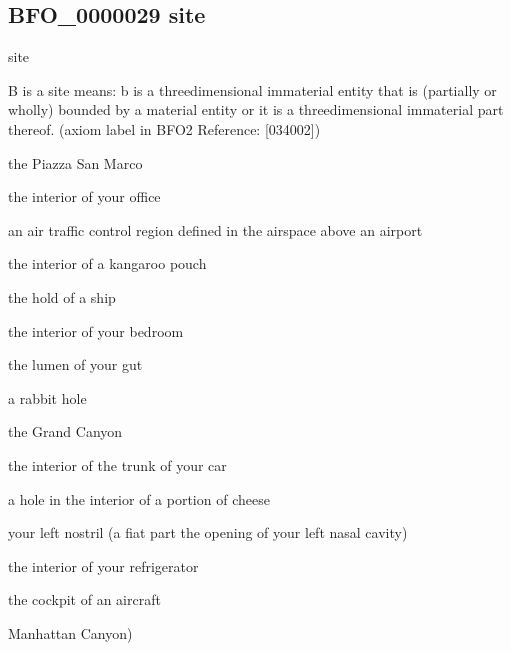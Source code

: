 \documentclass[letterpaper,10pt,english]{sphinxmanual}
\begin{document}
\begin{sphinxShadowBox}

\sphinxAtStartPar
{}
\end{sphinxShadowBox}
\begin{quote}

\ignorespaces \end{quote}


\subsection{BFO\_0000029 \sphinxhyphen{} site}
\label{\detokenize{doc-BFO_0000029:bfo-0000029-site}}\label{\detokenize{doc-BFO_0000029:index-0}}\label{\detokenize{doc-BFO_0000029::doc}}
\begin{sphinxShadowBox}

\sphinxAtStartPar
site
\end{sphinxShadowBox}

\begin{sphinxShadowBox}

\sphinxAtStartPar
B is a site means: b is a three\sphinxhyphen{}dimensional immaterial entity that is (partially or wholly) bounded by a material entity or it is a three\sphinxhyphen{}dimensional immaterial part thereof. (axiom label in BFO2 Reference: {[}034\sphinxhyphen{}002{]})
\end{sphinxShadowBox}

\begin{sphinxShadowBox}

\sphinxAtStartPar
the Piazza San Marco

\sphinxAtStartPar
the interior of your office

\sphinxAtStartPar
an air traffic control region defined in the airspace above an airport

\sphinxAtStartPar
the interior of a kangaroo pouch

\sphinxAtStartPar
the hold of a ship

\sphinxAtStartPar
the interior of your bedroom

\sphinxAtStartPar
the lumen of your gut

\sphinxAtStartPar
a rabbit hole

\sphinxAtStartPar
the Grand Canyon

\sphinxAtStartPar
the interior of the trunk of your car

\sphinxAtStartPar
a hole in the interior of a portion of cheese

\sphinxAtStartPar
your left nostril (a fiat part \textendash{} the opening \textendash{} of your left nasal cavity)

\sphinxAtStartPar
the interior of your refrigerator

\sphinxAtStartPar
the cockpit of an aircraft

\sphinxAtStartPar
Manhattan Canyon)
\end{sphinxShadowBox}
\end{document}
